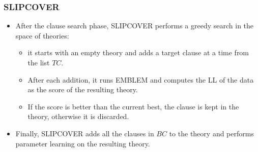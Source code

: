 \documentclass[trans,aspectratio=1610]{beamer}
\begin{document}
\begin{frame}
\frametitle{SLIPCOVER}

	\begin{itemize}
\item
After the clause search phase, SLIPCOVER performs a greedy search in the space of theories:
	\begin{itemize}
\item it starts with an empty theory and  adds a target clause at a time from the list $TC$.
\item
After each addition, it runs EMBLEM and computes the LL of the data as the score of the resulting theory.
\item If the score is better than the current best, the clause is kept in the theory, otherwise it is discarded.
\end{itemize}
\item
Finally, SLIPCOVER adds all the clauses in $BC$ to the theory and performs parameter learning on the resulting theory.
\end{itemize}
\end{frame}
\end{document}

